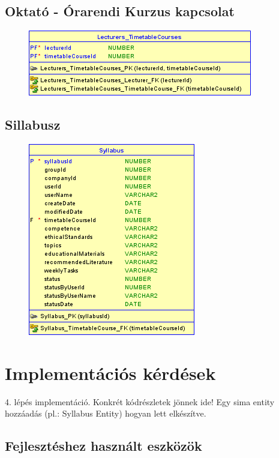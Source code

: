 \documentclass[hidelinks, 12pt, a4paper]{report}
\begin{document}
\subsection{Oktató - Órarendi Kurzus kapcsolat}

\begin{figure}[H]
    \centering
	\includegraphics{lecturer_timetable_course.png}
\end{figure}

\subsection{Sillabusz}

\begin{figure}[H]
    \centering
	\includegraphics{syllabus.png}
\end{figure}

\section{Implementációs kérdések}

4. lépés implementáció. Konkrét kódrészletek jönnek ide! Egy sima entity hozzáadás (pl.: Syllabus Entity) hogyan lett elkészítve.

\subsection{Fejlesztéshez használt eszközök}
\end{document}
